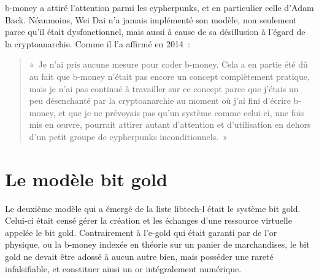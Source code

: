 b-money a attiré l'attention parmi les cypherpunks, et en particulier celle d'Adam Back. Néanmoins, Wei Dai n'a jamais implémenté son modèle, non seulement parce qu'il était dysfonctionnel, mais aussi à cause de sa désillusion à l'égard de la cryptoanarchie. Comme il l'a affirmé en 2014~:

\begin{quote}
«~Je n'ai pris aucune mesure pour coder b-money. Cela a en partie été dû au fait que b-money n'était pas encore un concept complètement pratique, mais je n'ai pas continué à travailler sur ce concept parce que j'étais un peu désenchanté par la cryptoanarchie au moment où j'ai fini d'écrire b-money, et que je ne prévoyais pas qu'un système comme celui-ci, une fois mis en œuvre, pourrait attirer autant d'attention et d'utilisation en dehors d'un petit groupe de cypherpunks inconditionnels.~»
\end{quote}


\section*{Le modèle bit gold} %

Le deuxième modèle qui a émergé de la liste libtech-l était le système bit gold. Celui-ci était censé gérer la création et les échanges d'une ressource virtuelle appelée le bit gold. Contrairement à l'e-gold qui était garanti par de l'or physique, ou la b-money indexée en théorie sur un panier de marchandises, le bit gold ne devait être adossé à aucun autre bien, mais posséder une rareté infalsifiable, et constituer ainsi un or intégralement numérique. %

